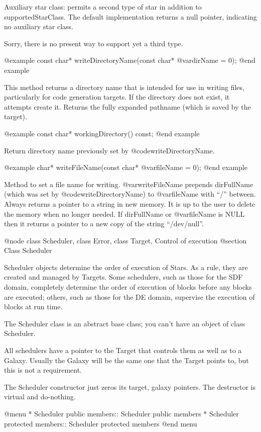 Auxiliary star class: permits a second type of star in addition
to supportedStarClass.  The default implementation returns a
null pointer, indicating no auxiliary star class.

Sorry, there is no present way to support yet a third type.

@example
const char* writeDirectoryName(const char* @var{dirName} = 0);
@end example

This method returns a directory name that is intended for
use in writing files, particularly for code generation targets.
If the directory does not exist, it attempts create it.
Returns the fully expanded pathname (which is saved by
the target).

@example
const char* workingDirectory() const;
@end example

Return directory name previously set by @code{writeDirectoryName}.

@example
char* writeFileName(const char* @var{fileName} = 0);
@end example

Method to set a file name for writing.  @var{writeFileName} prepends
dirFullName (which was set by @code{writeDirectoryName}) to
@var{fileName} with ``/'' between.  Always returns a pointer to a string
in new memory.  It is up to the user to delete the memory when no longer
needed.  If dirFullName or @var{fileName} is NULL then it returns a pointer to
a new copy of the string ``/dev/null''.

@node class Scheduler, class Error, class Target, Control of execution
@section Class Scheduler

Scheduler objects determine the order of execution of Stars.  As a rule,
they are created and managed by Targets.  Some schedulers, such as those
for the SDF domain, completely determine the order of execution of
blocks before any blocks are executed; others, such as those for the
DE domain, supervise the execution of blocks at run time.

The Scheduler class is an abstract base class; you can't have an object
of class Scheduler.

All schedulers have a pointer to the Target that controls them as well
as to a Galaxy.  Usually the Galaxy will be the same one that the
Target points to, but this is not a requirement.

The Scheduler constructor just zeros its target, galaxy pointers.  The
destructor is virtual and do-nothing.

@menu
* Scheduler public members::  Scheduler public members
* Scheduler protected members::  Scheduler protected members
@end menu

